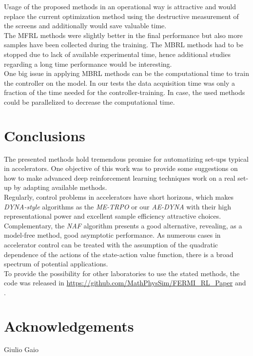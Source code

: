 \documentclass[
reprint,
amsmath,amssymb,amsfonts,clevref,
aps,
prstab,
]{revtex4-2}
\begin{document}
	Usage of the proposed methods in an operational way is attractive and would replace the current optimization method using the destructive measurement of the screens and additionally would save valuable time.\\ 
	The MFRL methods were slightly better in the final performance but also more samples have been collected during the training. The MBRL methods had to be stopped due to lack of available experimental time, hence additional studies regarding a long time performance would be interesting.\\ One big issue in applying MBRL methods can be the computational time to train the controller on the model. In our tests the data acquisition time was only a fraction of the time needed for the controller-training. In case, the used methods could be parallelized to decrease the computational time.
	
\section{Conclusions}
 The presented methods hold tremendous promise for automatizing set-ups typical in accelerators. One objective of this work was to provide some suggestions on how to make advanced deep reinforcement learning techniques work on a real set-up by adapting available methods.\\
Regularly, control problems in accelerators have short horizons, which makes \emph{DYNA-style} algorithms as the \emph{ME-TRPO} or our \emph{AE-DYNA} with their high representational power and excellent sample efficiency attractive choices.\\
Complementary, the \emph{NAF} algorithm presents a good alternative, revealing, as a model-free method, good asymptotic performance. As numerous cases in accelerator control can be treated with the assumption of the quadratic dependence of the actions of the state-action value function, there is a broad spectrum of potential applications.\\
 
 To provide the possibility for other laboratories to use the stated methods, the code was released in \url{https://github.com/MathPhysSim/FERMI_RL_Paper} and \cite{Hirlaender2020b}.
 
 \section{Acknowledgements}
 Giulio Gaio
 \vfill
 \newpage
 \vfill
 
\end{document}
